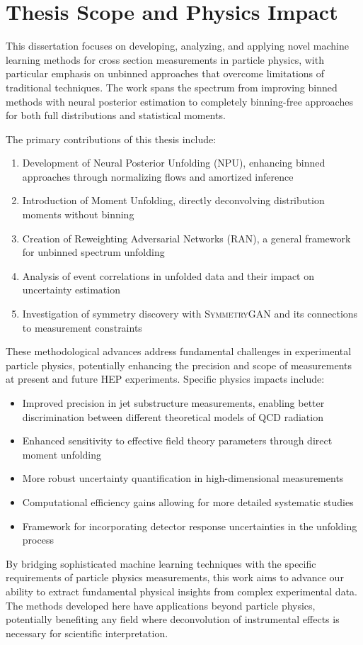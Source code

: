 \section{Thesis Scope and Physics Impact}

This dissertation focuses on developing, analyzing, and applying novel machine learning methods for cross section measurements in particle physics, with particular emphasis on unbinned approaches that overcome limitations of traditional techniques. The work spans the spectrum from improving binned methods with neural posterior estimation to completely binning-free approaches for both full distributions and statistical moments.

The primary contributions of this thesis include:

\begin{enumerate}
\item Development of Neural Posterior Unfolding (NPU), enhancing binned approaches through normalizing flows and amortized inference
\item Introduction of Moment Unfolding, directly deconvolving distribution moments without binning
\item Creation of Reweighting Adversarial Networks (RAN), a general framework for unbinned spectrum unfolding
\item Analysis of event correlations in unfolded data and their impact on uncertainty estimation
\item Investigation of symmetry discovery with \textsc{SymmetryGAN} and its connections to measurement constraints
\end{enumerate}

These methodological advances address fundamental challenges in experimental particle physics, potentially enhancing the precision and scope of measurements at present and future HEP experiments.
%
Specific physics impacts include:

\begin{itemize}
\item Improved precision in jet substructure measurements, enabling better discrimination between different theoretical models of QCD radiation
\item Enhanced sensitivity to effective field theory parameters through direct moment unfolding
\item More robust uncertainty quantification in high-dimensional measurements
\item Computational efficiency gains allowing for more detailed systematic studies
\item Framework for incorporating detector response uncertainties in the unfolding process
\end{itemize}

By bridging sophisticated machine learning techniques with the specific requirements of particle physics measurements, this work aims to advance our ability to extract fundamental physical insights from complex experimental data. The methods developed here have applications beyond particle physics, potentially benefiting any field where deconvolution of instrumental effects is necessary for scientific interpretation.